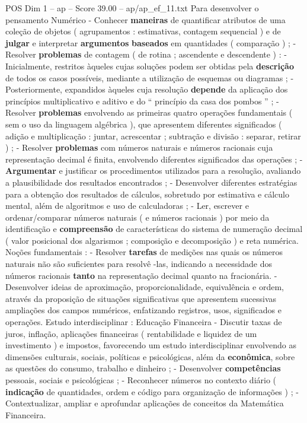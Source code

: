 \begin{textsample}{POS Dim 1 – ap – Score 39.00 – ap/ap\_ef\_11.txt}
Para desenvolver o pensamento Numérico - Conhecer \textbf{maneiras} de quantificar atributos de uma coleção de objetos ( agrupamentos : estimativas, contagem sequencial ) e de \textbf{julgar} e interpretar \textbf{argumentos} \textbf{baseados} em quantidades ( comparação ) ; - Resolver \textbf{problemas} de contagem ( de rotina ; ascendente e descendente ) : - Inicialmente, restritos àqueles cujas soluções podem ser obtidas pela \textbf{descrição} de todos os casos possíveis, mediante a utilização de esquemas ou diagramas ; - Posteriormente, expandidos àqueles cuja resolução \textbf{depende} da aplicação dos princípios multiplicativo e aditivo e do “ princípio da casa dos pombos ” ; - Resolver \textbf{problemas} envolvendo as primeiras quatro operações fundamentais ( sem o uso da linguagem algébrica ), que apresentem diferentes significados ( adição e multiplicação : juntar, acrescentar ; subtração e divisão : separar, retirar ) ; - Resolver \textbf{problemas} com números naturais e números racionais cuja representação decimal é finita, envolvendo diferentes significados das operações ; - \textbf{Argumentar} e justificar os procedimentos utilizados para a resolução, avaliando a plausibilidade dos resultados encontrados ; - Desenvolver diferentes estratégias para a obtenção dos resultados de cálculos, sobretudo por estimativa e cálculo mental, além de algoritmos e uso de calculadoras ; - Ler, escrever e ordenar/comparar números naturais ( e números racionais ) por meio da identificação e \textbf{compreensão} de características do sistema de numeração decimal ( valor posicional dos algarismos ; composição e decomposição ) e reta numérica.
Noções fundamentais : - Resolver \textbf{tarefas} de medições nas quais os números naturais não são suficientes para resolvê -las, indicando a necessidade dos números racionais \textbf{tanto} na representação decimal quanto na fracionária. - Desenvolver ideias de aproximação, proporcionalidade, equivalência e ordem, através da proposição de situações significativas que apresentem sucessivas ampliações dos campos numéricos, enfatizando registros, usos, significados e operações.
Estudo interdisciplinar : Educação Financeira - Discutir taxas de juros, inflação, aplicações financeiras ( rentabilidade e liquidez de um investimento ) e impostos, favorecendo um estudo interdisciplinar envolvendo as dimensões culturais, sociais, políticas e psicológicas, além da \textbf{econômica}, sobre as questões do consumo, trabalho e dinheiro ; - Desenvolver \textbf{competências} pessoais, sociais e psicológicas ; - Reconhecer números no contexto diário ( \textbf{indicação} de quantidades, ordem e código para organização de informações ) ; - Contextualizar, ampliar e aprofundar aplicações de conceitos da Matemática Financeira.

\end{textsample}
